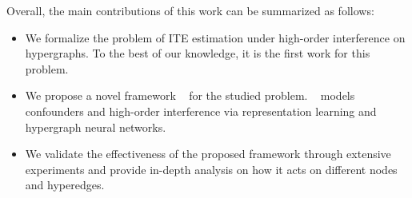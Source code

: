 Overall, the main contributions of this work can be summarized as follows:

\begin{itemize}
    \item %
    We formalize the problem of ITE estimation under high-order interference on hypergraphs. To the best of our knowledge, it is the first work for this problem.%
    \item %
    We propose a novel framework \mymodel~ for the studied problem. \mymodel~ models confounders and high-order interference via representation learning and hypergraph neural networks.
    \item %
    We validate the effectiveness of the proposed framework through extensive experiments and provide in-depth analysis on how it acts on different nodes and hyperedges.
\end{itemize}



